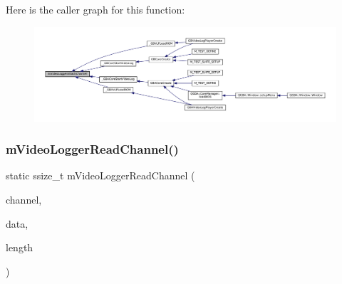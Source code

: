 Here is the caller graph for this function\+:
\nopagebreak
\begin{figure}[H]
\begin{center}
\leavevmode
\includegraphics[width=350pt]{video-logger_8c_ab35cded24430e8df5eea72310c1827be_icgraph}
\end{center}
\end{figure}
\mbox{\label{video-logger_8c_aad574cf14798e8c2e42090aa1378c7fe}} 
\subsubsection{\texorpdfstring{m\+Video\+Logger\+Read\+Channel()}{mVideoLoggerReadChannel()}}
{\footnotesize\ttfamily static ssize\+\_\+t m\+Video\+Logger\+Read\+Channel (\begin{DoxyParamCaption}\item[{struct m\+Video\+Log\+Channel $\ast$}]{channel,  }\item[{void $\ast$}]{data,  }\item[{size\+\_\+t}]{length }\end{DoxyParamCaption})\hspace{0.3cm}{\ttfamily [static]}}

